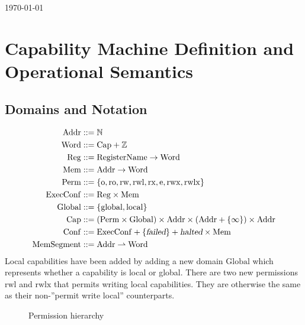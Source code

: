 \documentclass[a4paper]{article}
\newcommand{\parfun}{\rightharpoonup}
\newcommand{\failed}{\textsl{failed}}
\newcommand{\halted}{\textsl{halted}}
\newcommand{\plaindom}[1]{\mathrm{#1}}
\newcommand{\Caps}{\plaindom{Cap}}
\newcommand{\Words}{\plaindom{Word}}
\newcommand{\Addrs}{\plaindom{Addr}}
\newcommand{\ExecConfs}{\plaindom{ExecConf}}
\newcommand{\RegName}{\plaindom{RegisterName}}
\newcommand{\Regs}{\plaindom{Reg}}
\newcommand{\Heaps}{\plaindom{Mem}}
\newcommand{\HeapSegments}{\plaindom{MemSegment}}
\newcommand{\Confs}{\plaindom{Conf}}
\newcommand{\nats}{\mathbb{N}}
\newcommand{\ints}{\mathbb{Z}}
\newcommand{\Perms}{\plaindom{Perm}}
\newcommand{\Globals}{\plaindom{Global}}
\newcommand{\plainperm}[1]{\mathrm{#1}}
\newcommand{\noperm}{\plainperm{o}}
\newcommand{\readonly}{\plainperm{ro}}
\newcommand{\readwrite}{\plainperm{rw}}
\newcommand{\exec}{\plainperm{rx}}
\newcommand{\entry}{\plainperm{e}}
\newcommand{\rwx}{\plainperm{rwx}}
\newcommand{\readwritel}{\plainperm{rwl}}
\newcommand{\rwlx}{\plainperm{rwlx}}
\newcommand{\local}{\plainperm{local}}
\newcommand{\glob}{\plainperm{global}}
\begin{document}
\begin{flushright}
  \today
\end{flushright}

\tableofcontents

\section{Capability Machine Definition and Operational Semantics}
\subsection{Domains and Notation}

\begin{align*}
  \Addrs &::= \nats\\
  \Words &::= \Caps + \ints \\
  \Regs  &::= \RegName \rightarrow \Words\\
  \Heaps &::= \Addrs \rightarrow \Words \\
  \Perms &::= \{ \noperm, \readonly, \readwrite, \readwritel, \exec, \entry, \rwx, \rwlx\}\\
  \ExecConfs  &::= \Regs \times \Heaps \\
  \Globals & ::= \{\glob, \local \} \\
  \Caps  &::= (\Perms \times \Globals) \times \Addrs \times (\Addrs + \{ \infty \}) \times \Addrs\\
  \Confs &::= \ExecConfs + \{\failed \} + \halted \times \Heaps \\
  \HeapSegments &::= \Addrs \parfun \Words
\end{align*}
Local capabilities have been added by adding a new domain $\Globals$ which represents whether a capability is local or global. There are two new permissions $\readwritel$ and $\rwlx$ that permits writing local capabilities. They are otherwise the same as their non-''permit write local'' counterparts.

\begin{figure}[!h]
  \centering
  \caption{Permission hierarchy}
  \label{fig:glob-hier}
\end{figure}
\end{document}
